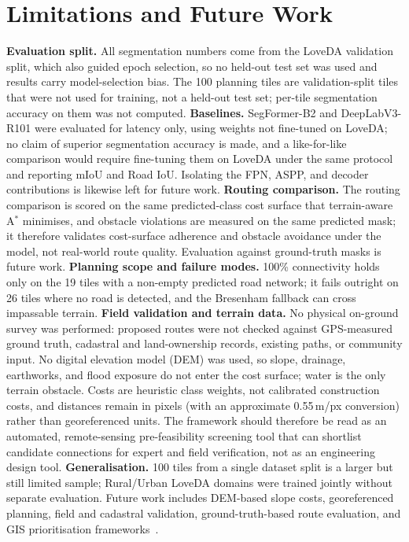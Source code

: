 \documentclass[runningheads]{llncs}
\begin{document}
\section{Limitations and Future Work}\label{sec:limits}
\textbf{Evaluation split.} All segmentation numbers come from the LoveDA validation split, which also guided epoch selection, so no held-out test set was used and results carry model-selection bias. The 100 planning tiles are validation-split tiles that were not used for training, not a held-out test set; per-tile segmentation accuracy on them was not computed. \textbf{Baselines.} SegFormer-B2 and DeepLabV3-R101 were evaluated for latency only, using weights not fine-tuned on LoveDA; no claim of superior segmentation accuracy is made, and a like-for-like comparison would require fine-tuning them on LoveDA under the same protocol and reporting mIoU and Road IoU. Isolating the FPN, ASPP, and decoder contributions is likewise left for future work. \textbf{Routing comparison.} The routing comparison is scored on the same predicted-class cost surface that terrain-aware A$^{*}$ minimises, and obstacle violations are measured on the same predicted mask; it therefore validates cost-surface adherence and obstacle avoidance under the model, not real-world route quality. Evaluation against ground-truth masks is future work. \textbf{Planning scope and failure modes.} 100\% connectivity holds only on the 19 tiles with a non-empty predicted road network; it fails outright on 26 tiles where no road is detected, and the Bresenham fallback can cross impassable terrain. \textbf{Field validation and terrain data.} No physical on-ground survey was performed: proposed routes were not checked against GPS-measured ground truth, cadastral and land-ownership records, existing paths, or community input. No digital elevation model (DEM) was used, so slope, drainage, earthworks, and flood exposure do not enter the cost surface; water is the only terrain obstacle. Costs are heuristic class weights, not calibrated construction costs, and distances remain in pixels (with an approximate 0.55\,m/px conversion) rather than georeferenced units. The framework should therefore be read as an automated, remote-sensing pre-feasibility screening tool that can shortlist candidate connections for expert and field verification, not as an engineering design tool. \textbf{Generalisation.} 100 tiles from a single dataset split is a larger but still limited sample; Rural/Urban LoveDA domains were trained jointly without separate evaluation. Future work includes DEM-based slope costs, georeferenced planning, field and cadastral validation, ground-truth-based route evaluation, and GIS prioritisation frameworks~\cite{verma2020,kapoor2021}.
\end{document}
